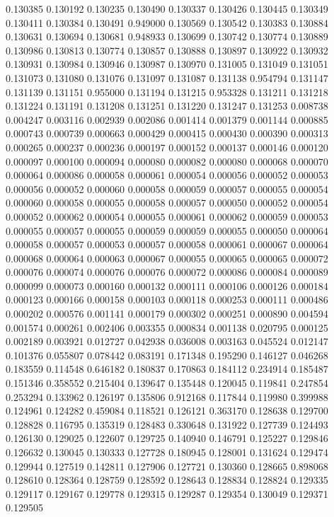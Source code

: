 0.130385
0.130192
0.130235
0.130490
0.130337
0.130426
0.130445
0.130349
0.130411
0.130384
0.130491
0.949000
0.130569
0.130542
0.130383
0.130884
0.130631
0.130694
0.130681
0.948933
0.130699
0.130742
0.130774
0.130889
0.130986
0.130813
0.130774
0.130857
0.130888
0.130897
0.130922
0.130932
0.130931
0.130984
0.130946
0.130987
0.130970
0.131005
0.131049
0.131051
0.131073
0.131080
0.131076
0.131097
0.131087
0.131138
0.954794
0.131147
0.131139
0.131151
0.955000
0.131194
0.131215
0.953328
0.131211
0.131218
0.131224
0.131191
0.131208
0.131251
0.131220
0.131247
0.131253
0.008738
0.004247
0.003116
0.002939
0.002086
0.001414
0.001379
0.001144
0.000885
0.000743
0.000739
0.000663
0.000429
0.000415
0.000430
0.000390
0.000313
0.000265
0.000237
0.000236
0.000197
0.000152
0.000137
0.000146
0.000120
0.000097
0.000100
0.000094
0.000080
0.000082
0.000080
0.000068
0.000070
0.000064
0.000086
0.000058
0.000061
0.000054
0.000056
0.000052
0.000053
0.000056
0.000052
0.000060
0.000058
0.000059
0.000057
0.000055
0.000054
0.000060
0.000058
0.000055
0.000058
0.000057
0.000050
0.000052
0.000054
0.000052
0.000062
0.000054
0.000055
0.000061
0.000062
0.000059
0.000053
0.000055
0.000057
0.000055
0.000059
0.000059
0.000055
0.000050
0.000064
0.000058
0.000057
0.000053
0.000057
0.000058
0.000061
0.000067
0.000064
0.000068
0.000064
0.000063
0.000067
0.000055
0.000065
0.000065
0.000072
0.000076
0.000074
0.000076
0.000076
0.000072
0.000086
0.000084
0.000089
0.000099
0.000073
0.000160
0.000132
0.000111
0.000106
0.000126
0.000184
0.000123
0.000166
0.000158
0.000103
0.000118
0.000253
0.000111
0.000486
0.000202
0.000576
0.001141
0.000179
0.000302
0.000251
0.000890
0.004594
0.001574
0.000261
0.002406
0.003355
0.000834
0.001138
0.020795
0.000125
0.002189
0.003921
0.012727
0.042938
0.036008
0.003163
0.045524
0.012147
0.101376
0.055807
0.078442
0.083191
0.171348
0.195290
0.146127
0.046268
0.183559
0.114548
0.646182
0.180837
0.170863
0.184112
0.234914
0.185487
0.151346
0.358552
0.215404
0.139647
0.135448
0.120045
0.119841
0.247854
0.253294
0.133962
0.126197
0.135806
0.912168
0.117844
0.119980
0.399988
0.124961
0.124282
0.459084
0.118521
0.126121
0.363170
0.128638
0.129700
0.128828
0.116795
0.135319
0.128483
0.330648
0.131922
0.127739
0.124493
0.126130
0.129025
0.122607
0.129725
0.140940
0.146791
0.125227
0.129846
0.126632
0.130045
0.130333
0.127728
0.180945
0.128001
0.131624
0.129474
0.129944
0.127519
0.142811
0.127906
0.127721
0.130360
0.128665
0.898068
0.128610
0.128364
0.128759
0.128592
0.128643
0.128834
0.128824
0.129335
0.129117
0.129167
0.129778
0.129315
0.129287
0.129354
0.130049
0.129371
0.129505
